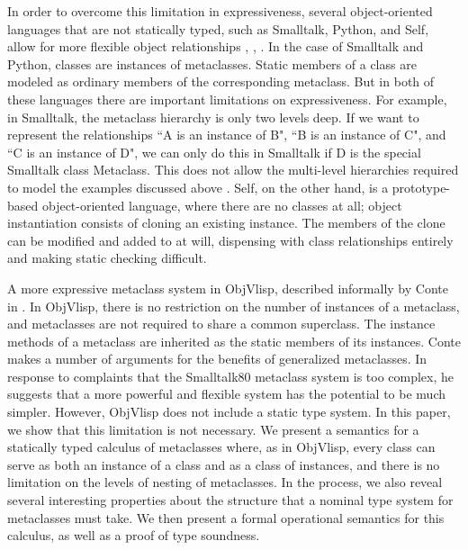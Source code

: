 \documentclass{acm-sigplan}
\begin{document}
In order to overcome this limitation in expressiveness, several
object-oriented languages that are not statically typed, such as
Smalltalk, Python, and Self, allow for more flexible object
relationships \cite{Smalltalk80}, \cite{ArtMOP}, \cite{PythonMeta}. In
the case of Smalltalk and Python, classes are instances of
metaclasses. Static members of a class are modeled as ordinary members
of the corresponding metaclass.  But in both of these languages there
are important limitations on expressiveness.  For example, in
Smalltalk, the metaclass hierarchy is only two levels deep.  If we
want to represent the relationships ``{\txt A} is an instance of {\txt
B}", ``{\txt B} is an instance of {\txt C}", and ``{\txt C} is an
instance of {\txt D}", we can only do this in Smalltalk if {\txt D} is
the special Smalltalk class {\txt Metaclass}.  This does not allow the
multi-level hierarchies required to model the examples discussed above
\cite{Smalltalk80}.  Self, on the other hand, is a prototype-based
object-oriented language, where there are no classes at all; object
instantiation consists of cloning an existing instance. The members of
the clone can be modified and added to at will, dispensing with class
relationships entirely and making static checking difficult.

A more expressive metaclass system in ObjVlisp, described informally
by Conte in \cite{objvlisp}.  In ObjVlisp, there is no restriction on
the number of instances of a metaclass, and metaclasses are not
required to share a common superclass. The instance methods of a
metaclass are inherited as the static members of its instances.  Conte
makes a number of arguments for the benefits of generalized
metaclasses.  In response to complaints that the Smalltalk80 metaclass
system is too complex, he suggests that a more powerful and flexible
system has the potential to be much simpler.
However, ObjVlisp does not include a static type system. 
In this paper, we show that this limitation is not necessary. We
present a semantics for a statically typed calculus of metaclasses
where, as in ObjVlisp, every class can serve as both an instance of a
class and as a class of instances, and there is no limitation on the
levels of nesting of metaclasses. In the process, we also reveal
several interesting properties about the structure that a nominal type
system for metaclasses must take. We then present a formal operational
semantics for this calculus, as well as a proof of type soundness.
\end{document}
